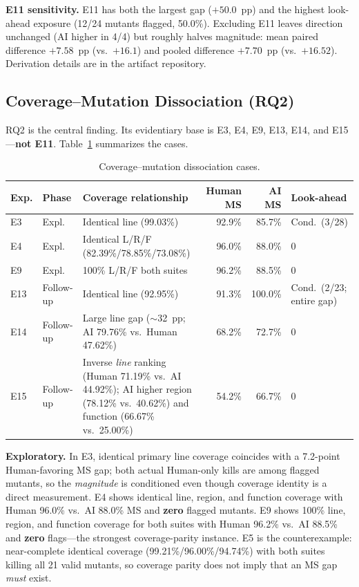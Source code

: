 \documentclass[10pt,conference,a4paper]{IEEEtran}
\begin{document}
\textbf{E11 sensitivity.} E11 has both the largest gap ($+50.0$~pp) and the highest look-ahead exposure (12/24 mutants flagged, 50.0\%). Excluding E11 leaves direction unchanged (AI higher in 4/4) but roughly halves magnitude: mean paired difference $\mathbf{+7.58}$~pp (vs.\ $+16.1$) and pooled difference $\mathbf{+7.70}$~pp (vs.\ $+16.52$). Derivation details are in the artifact repository.

\subsection{Coverage--Mutation Dissociation (RQ2)}
RQ2 is the central finding. Its evidentiary base is E3, E4, E9, E13, E14, and E15---\textbf{not E11}. Table~\ref{tab:rq2} summarizes the cases.

\begin{table}[t]
\centering
\caption{Coverage--mutation dissociation cases.}
\label{tab:rq2}
\small
\begin{tabular}{llp{4.6cm}rrl}
\toprule
Exp. & Phase & Coverage relationship & Human MS & AI MS & Look-ahead \\
\midrule
E3 & Expl. & Identical line (99.03\%) & 92.9\% & 85.7\% & Cond.\ (3/28) \\
E4 & Expl. & Identical L/R/F (82.39\%/78.85\%/73.08\%) & 96.0\% & 88.0\% & 0 \\
E9 & Expl. & 100\% L/R/F both suites & 96.2\% & 88.5\% & 0 \\
E13 & Follow-up & Identical line (92.95\%) & 91.3\% & 100.0\% & Cond.\ (2/23; entire gap) \\
E14 & Follow-up & Large line gap ($\sim$32~pp; AI 79.76\% vs.\ Human 47.62\%) & 68.2\% & 72.7\% & 0 \\
E15 & Follow-up & Inverse \emph{line} ranking (Human 71.19\% vs.\ AI 44.92\%); AI higher region (78.12\% vs.\ 40.62\%) and function (66.67\% vs.\ 25.00\%) & 54.2\% & 66.7\% & 0 \\
\bottomrule
\end{tabular}
\end{table}

\textbf{Exploratory.} In E3, identical primary line coverage coincides with a 7.2-point Human-favoring MS gap; both actual Human-only kills are among flagged mutants, so the \emph{magnitude} is conditioned even though coverage identity is a direct measurement. E4 shows identical line, region, and function coverage with Human 96.0\% vs.\ AI 88.0\% MS and \textbf{zero} flagged mutants. E9 shows 100\% line, region, and function coverage for both suites with Human 96.2\% vs.\ AI 88.5\% and \textbf{zero} flags---the strongest coverage-parity instance. E5 is the counterexample: near-complete identical coverage (99.21\%/96.00\%/94.74\%) with both suites killing all 21 valid mutants, so coverage parity does not imply that an MS gap \emph{must} exist.
\end{document}
